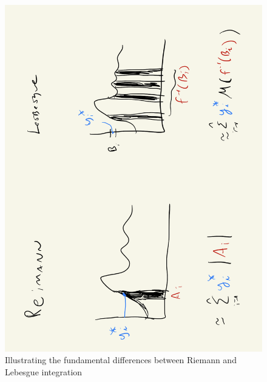 \documentclass{article} %
\begin{document}
\begin{figure}[H]
\centering 
\includegraphics[width=.7\textwidth, angle=270]{images/Lebesgue_vs_Riemann}
\caption{Illustrating the fundamental differences between Riemann and Lebesgue integration}
\label{fig:Lebesgue_vs_Riemann}
\end{figure}
\end{document}
